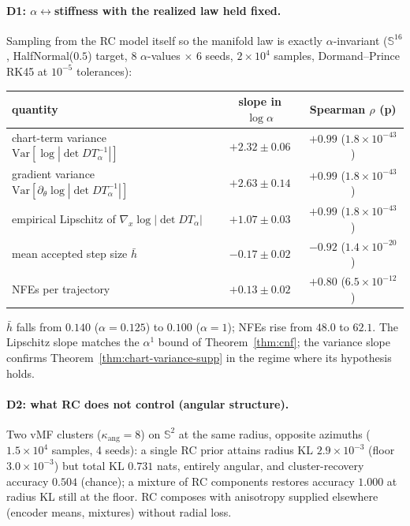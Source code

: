 \documentclass{article}
\newcommand{\Var}{\mathrm{Var}}
\theoremstyle{definition}
\theoremstyle{remark}
\newcommand{\SSS}{\mathbb{S}}
\begin{document}
\paragraph{D1: $\alpha\leftrightarrow$stiffness with the realized law held fixed.} Sampling from the RC model itself so the manifold law is exactly $\alpha$-invariant ($\SSS^{16}$, HalfNormal($0.5$) target, $8$ $\alpha$-values $\times$ $6$ seeds, $2\times10^4$ samples, Dormand--Prince RK45 at $10^{-5}$ tolerances):
\begin{center}\small
\begin{tabular}{lcc}
\toprule
quantity & slope in $\log\alpha$ & Spearman $\rho$ (p)\\
\midrule
chart-term variance $\Var[\log|\det DT_\alpha^{-1}|]$ & $+2.32\pm0.06$ & $+0.99$ ($1.8\!\times\!10^{-43}$)\\
gradient variance $\Var[\partial_\theta\log|\det DT_\alpha^{-1}|]$ & $+2.63\pm0.14$ & $+0.99$ ($1.8\!\times\!10^{-43}$)\\
empirical Lipschitz of $\nabla_x\log|\det DT_\alpha|$ & $+1.07\pm0.03$ & $+0.99$ ($1.8\!\times\!10^{-43}$)\\
mean accepted step size $\bar h$ & $-0.17\pm0.02$ & $-0.92$ ($1.4\!\times\!10^{-20}$)\\
NFEs per trajectory & $+0.13\pm0.02$ & $+0.80$ ($6.5\!\times\!10^{-12}$)\\
\bottomrule
\end{tabular}
\end{center}
$\bar h$ falls from $0.140$ ($\alpha{=}0.125$) to $0.100$ ($\alpha{=}1$); NFEs rise from $48.0$ to $62.1$. The Lipschitz slope matches the $\alpha^1$ bound of Theorem~\ref{thm:cnf}; the variance slope confirms Theorem~\ref{thm:chart-variance-supp} in the regime where its hypothesis holds.

\paragraph{D2: what RC does not control (angular structure).} Two vMF clusters ($\kappa_{\text{ang}}=8$) on $\SSS^2$ at the same radius, opposite azimuths ($1.5\times10^4$ samples, 4 seeds): a single RC prior attains radius KL $2.9\times10^{-3}$ (floor $3.0\times10^{-3}$) but total KL $0.731$ nats, entirely angular, and cluster-recovery accuracy $0.504$ (chance); a mixture of RC components restores accuracy $1.000$ at radius KL still at the floor. RC composes with anisotropy supplied elsewhere (encoder means, mixtures) without radial loss.
\end{document}
